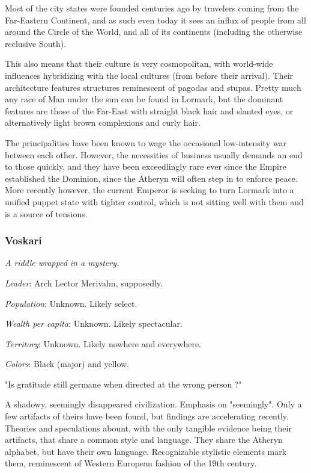 Most of the city states were founded centuries ago by travelers coming from the Far-Eastern Continent, and as such even today it sees an influx of people from all around the Circle of the World, and all of its continents (including the otherwise reclusive South). 

This also means that their culture is very cosmopolitan, with world-wide influences hybridizing with the local cultures (from before their arrival). Their architecture features structures reminescent of pagodas and stupas. Pretty much any race of Man under the sun can be found in Lormark, but the dominant features are those of the Far-East with straight black hair and slanted eyes, or alternatively light brown complexions and curly hair.

The principalities have been known to wage the occasional low-intensity war between each other. However, the necessities of business usually demands an end to those quickly, and they have been exceedlingly rare ever since the Empire established the Dominion, since the Atheryn will often step in to enforce peace. More recently however, the current Emperor is seeking to turn Lormark into a unified puppet state with tighter control, which is not sitting well with them and is a source of tensions.


\subsubsection{Voskari}

\textit{A riddle wrapped in a mystery.}

\textit{Leader}: Arch Lector Merivahn, supposedly.

\textit{Population}: Unknown. Likely select.

\textit{Wealth per capita}: Unknown. Likely spectacular.

\textit{Territory}: Unknown. Likely nowhere and everywhere.
    
\textit{Colors}: Black (major) and yellow.


\begin{rpg-quotebox}
	"Is gratitude still germane when directed at the wrong person ?"
\end{rpg-quotebox}

A shadowy, seemingly disappeared civilization. Emphasis on "seemingly". Only a few artifacts of theirs have been found, but findings are accelerating recently. Theories and speculations abount, with the only tangible evidence being their artifacts, that share a common style and language. They share the Atheryn alphabet, but have their own language. Recognizable stylistic elements mark them, reminescent of Western European fashion of the 19th century.

